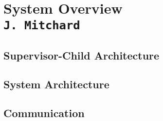 \pagestyle{empty}
\section{System Overview\\{\small\tt J.~Mitchard}}


\subsection{Supervisor-Child Architecture}

\subsection{System Architecture}
%

\subsection{Communication}

\clearpage
\endinput
